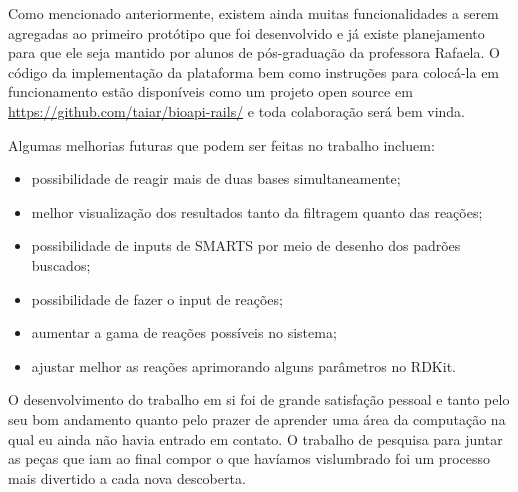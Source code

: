 \documentclass{abnt}
\begin{document}
Como mencionado anteriormente, existem ainda muitas funcionalidades a serem agregadas
ao primeiro protótipo que foi desenvolvido e já existe planejamento para que ele
seja mantido por alunos de pós-graduação da professora Rafaela. O código da implementação
da plataforma bem como instruções para colocá-la em funcionamento estão disponíveis
como um projeto open source em \url{https://github.com/taiar/bioapi-rails/} e toda
colaboração será bem vinda.

Algumas melhorias futuras que podem ser feitas no trabalho incluem:

\begin{itemize}
  \item possibilidade de reagir mais de duas bases simultaneamente;
  \item melhor visualização dos resultados tanto da filtragem quanto das reações;
  \item possibilidade de inputs de SMARTS por meio de desenho dos padrões buscados;
  \item possibilidade de fazer o input de reações;
  \item aumentar a gama de reações possíveis no sistema;
  \item ajustar melhor as reações aprimorando alguns parâmetros no RDKit.
\end{itemize}

O desenvolvimento do trabalho em si foi de grande satisfação pessoal e tanto pelo
seu bom andamento quanto pelo prazer de aprender uma área da computação na qual
eu ainda não havia entrado em contato. O trabalho de pesquisa para juntar as peças
que iam ao final compor o que havíamos vislumbrado foi um processo mais divertido
a cada nova descoberta.


\end{document}
